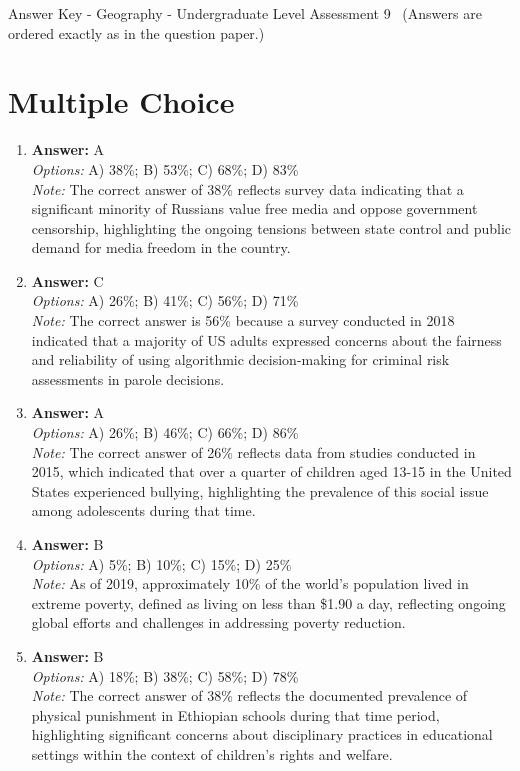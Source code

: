\documentclass[12pt]{article}
\begin{document}
\begin{center}
Answer Key - Geography - Undergraduate Level Assessment 9 \
\small (Answers are ordered exactly as in the question paper.)
\end{center}

\section*{Multiple Choice}
\begin{enumerate}[label=\arabic*.]
\item \textbf{Answer:} A
\\ \textit{Options:} A) 38\%; B) 53\%; C) 68\%; D) 83\%
\\ \textit{Note:} The correct answer of 38\% reflects survey data indicating that a significant minority of Russians value free media and oppose government censorship, highlighting the ongoing tensions between state control and public demand for media freedom in the country.
\item \textbf{Answer:} C
\\ \textit{Options:} A) 26\%; B) 41\%; C) 56\%; D) 71\%
\\ \textit{Note:} The correct answer is 56\% because a survey conducted in 2018 indicated that a majority of US adults expressed concerns about the fairness and reliability of using algorithmic decision-making for criminal risk assessments in parole decisions.
\item \textbf{Answer:} A
\\ \textit{Options:} A) 26\%; B) 46\%; C) 66\%; D) 86\%
\\ \textit{Note:} The correct answer of 26\% reflects data from studies conducted in 2015, which indicated that over a quarter of children aged 13-15 in the United States experienced bullying, highlighting the prevalence of this social issue among adolescents during that time.
\item \textbf{Answer:} B
\\ \textit{Options:} A) 5\%; B) 10\%; C) 15\%; D) 25\%
\\ \textit{Note:} As of 2019, approximately 10\% of the world's population lived in extreme poverty, defined as living on less than \$1.90 a day, reflecting ongoing global efforts and challenges in addressing poverty reduction.
\item \textbf{Answer:} B
\\ \textit{Options:} A) 18\%; B) 38\%; C) 58\%; D) 78\%
\\ \textit{Note:} The correct answer of 38\% reflects the documented prevalence of physical punishment in Ethiopian schools during that time period, highlighting significant concerns about disciplinary practices in educational settings within the context of children's rights and welfare.
\end{enumerate}
\end{document}
